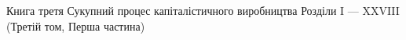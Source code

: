 Книга третя
Сукупний процес капіталістичного виробництва
Розділи I — XXVIII
(Третій том, Перша частина)
